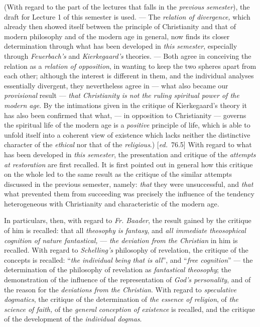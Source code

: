 \documentclass[12pt,a4paper,openany]{book}
\newcommand{\kpage}[1]{\marginnote{\footnotesize\textit{[#1]}}}
\newcommand{\ed}[1]{{\small[\textit{ed.}\ #1]}}
\begin{document}
(With regard to the part of the lectures that falls in the \emph{previous
semester}), the draft for Lecture 1 of this semester is used. ---
The \emph{relation of divergence,} which already then showed itself between the principle of Christianity\kpage{178}
and that of modern philosophy and of the modern age in general,
now finds its closer determination through what has been developed in \emph{this semester},
especially through \emph{Feuerbach's} and \emph{Kierkegaard's} theories. --- Both
agree in conceiving the relation as a \emph{relation of opposition}, in
wanting to keep the two spheres apart from each other; although the interest is
different in them, and the individual analyses essentially divergent,
they nevertheless agree in --- what also became our \emph{provisional} result --- \emph{that Christianity
is not the ruling spiritual power of the modern age}. By the intimations given in the critique
of Kierkegaard's theory it has also been confirmed
that what, --- in opposition to Christianity --- governs
the spiritual life of the modern age is a \emph{positive} principle of life, which is able to
unfold itself into a coherent view of existence which
lacks neither the distinctive character of the \emph{ethical} nor that of the \emph{religious}.)
\ed{76.5} With regard to what has been developed in \emph{this semester}, the presentation
and critique of the \emph{attempts at restoration} are first recalled. It is
first pointed out in general how this critique on the whole led to
the same result as the critique of the similar attempts discussed in the previous semester,
namely: \emph{that} they were unsuccessful, and \emph{that} what prevented
them from succeeding was precisely the influence of the tendency heterogeneous
with Christianity and characteristic of the modern age.

In particulars, then, with regard to \emph{Fr. Baader}, the result gained
by the critique of him is recalled: that all \emph{theosophy is fantasy}, and
\emph{all immediate theosophical cognition of nature fantastical,} --- \emph{the
deviation from the Christian} in him is recalled. With regard to \emph{Schelling's}
philosophy of revelation, the critique of the concepts is recalled:
``\emph{the individual being that is all}'', and ``\emph{free cognition}'' --- the determination
of the philosophy of revelation as \emph{fantastical theosophy}; the demonstration
of the influence of the representation of \emph{God's personality}, and of
the reason for the \emph{deviations from the Christian}. With regard to \emph{speculative
dogmatics}, the critique of the determination of \emph{the essence of
religion}, of \emph{the science of faith,} of the \emph{general} \emph{conception of existence} is recalled,
and the critique of the development of the \emph{individual dogmas}.
\end{document}
